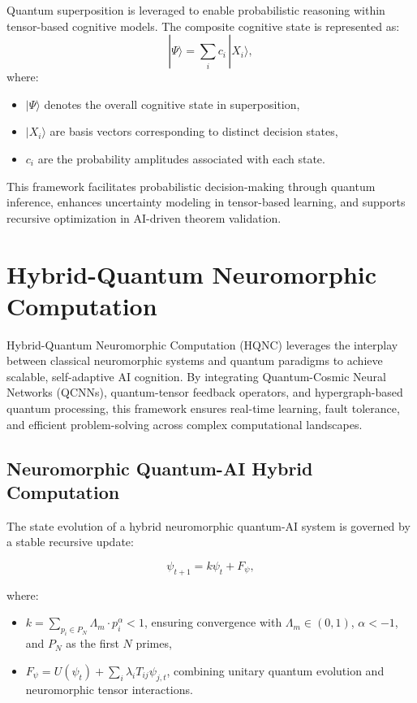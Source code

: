\documentclass{article}
\theoremstyle{plain}
\begin{document}
Quantum superposition is leveraged to enable probabilistic reasoning within tensor-based cognitive models. The composite cognitive state is represented as:
\[
|\Psi\rangle = \sum_{i} c_i\, |X_i\rangle,
\]
where:
\begin{itemize}
    \item \(|\Psi\rangle\) denotes the overall cognitive state in superposition,
    \item \(|X_i\rangle\) are basis vectors corresponding to distinct decision states,
    \item \(c_i\) are the probability amplitudes associated with each state.
\end{itemize}
This framework facilitates probabilistic decision-making through quantum inference, enhances uncertainty modeling in tensor-based learning, and supports recursive optimization in AI-driven theorem validation.



\section{Hybrid-Quantum Neuromorphic Computation}
\label{sec:hybrid_quantum_neuromorphic}

Hybrid-Quantum Neuromorphic Computation (HQNC) leverages the interplay between classical neuromorphic systems and quantum paradigms to achieve scalable, self-adaptive AI cognition. By integrating Quantum-Cosmic Neural Networks (QCNNs), quantum-tensor feedback operators, and hypergraph-based quantum processing, this framework ensures real-time learning, fault tolerance, and efficient problem-solving across complex computational landscapes.

\subsection{Neuromorphic Quantum-AI Hybrid Computation}
The state evolution of a hybrid neuromorphic quantum-AI system is governed by a stable recursive update:

\[
\psi_{t+1} = k \psi_t + F_\psi,
\]

where:
\begin{itemize}
    \item \( k = \sum_{p_i \in P_N} \Lambda_m \cdot p_i^\alpha < 1 \), ensuring convergence with \( \Lambda_m \in (0, 1) \), \( \alpha < -1 \), and \( P_N \) as the first \( N \) primes,
    \item \( F_\psi = U(\psi_t) + \sum_{i} \lambda_i T_{ij} \psi_{j,t} \), combining unitary quantum evolution and neuromorphic tensor interactions.
\end{itemize}
\end{document}
